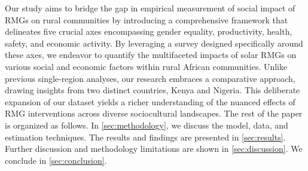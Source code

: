 Our study aims to bridge the gap in empirical measurement of social impact of RMGs on rural communities by introducing a comprehensive framework that delineates five crucial axes encompassing gender equality, productivity, health, safety, and economic activity. By leveraging a survey designed specifically around these axes, we endeavor to quantify the multifaceted impacts of solar RMGs on various social and economic factors within rural African communities. Unlike previous single-region analyses, our research embraces a comparative approach, drawing insights from two distinct countries, Kenya and Nigeria. This deliberate expansion of our dataset yields a richer understanding of the nuanced effects of RMG interventions across diverse sociocultural landscapes. The rest of the paper is organized as follows. In \cref{sec:methodology}, we discuss the model, data, and estimation techniques. The results and findings are presented in \cref{sec:results}. Further discussion and methodology limitations are shown in \cref{sec:discussion}. We conclude in \cref{sec:conclusion}.